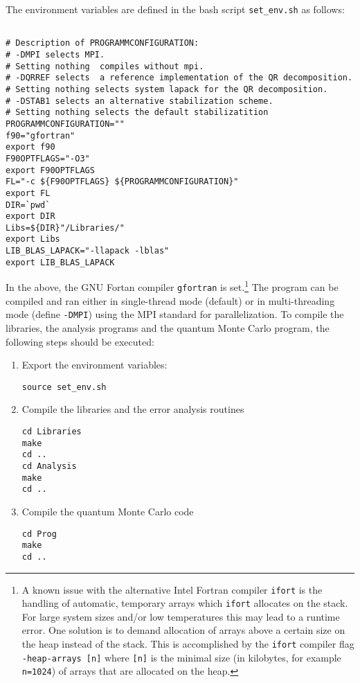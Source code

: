 The environment variables are defined in the bash script \texttt{set\_env.sh} as follows:
\lstset{style=custombash}
\begin{lstlisting}

# Description of PROGRAMMCONFIGURATION:
# -DMPI selects MPI.
# Setting nothing  compiles without mpi.
# -DQRREF selects  a reference implementation of the QR decomposition. 
# Setting nothing selects system lapack for the QR decomposition.
# -DSTAB1 selects an alternative stabilization scheme.
# Setting nothing selects the default stabilizatition
PROGRAMMCONFIGURATION=""
f90="gfortran"
export f90
F90OPTFLAGS="-O3"
export F90OPTFLAGS
FL="-c ${F90OPTFLAGS} ${PROGRAMMCONFIGURATION}"
export FL
DIR=`pwd`
export DIR
Libs=${DIR}"/Libraries/"
export Libs
LIB_BLAS_LAPACK="-llapack -lblas"
export LIB_BLAS_LAPACK

\end{lstlisting}
In the above, the GNU Fortan compiler \texttt{gfortran} is set.\footnote{A known issue with the alternative Intel Fortran compiler \texttt{ifort} is the handling of automatic, temporary arrays 
which \texttt{ifort} allocates on the stack. For large system sizes and/or low temperatures this may lead to 
a runtime error. One solution is to demand allocation of arrays above a certain size on the heap instead of the stack. 
This is accomplished by the \texttt{ifort} compiler flag \texttt{-heap-arrays [n]} where \texttt{[n]} is the minimal size (in kilobytes, for example \texttt{n=1024}) of arrays 
that are allocated on the heap.}
The program can be compiled and ran either in single-thread mode (default) or 
in multi-threading mode (define \texttt{-DMPI}) using the MPI standard for parallelization.
To compile the libraries, the analysis programs and the quantum Monte Carlo program, the following steps should be executed:
\begin{enumerate}
\item Export  the environment variables:
\begin{verbatim}
source set_env.sh
\end{verbatim}
\item Compile the libraries and the error analysis routines
\begin{verbatim}
cd Libraries
make
cd ..
cd Analysis
make
cd ..
\end{verbatim}
\item Compile the quantum Monte Carlo code
\begin{verbatim}
cd Prog
make
cd ..
\end{verbatim}
\end{enumerate}

